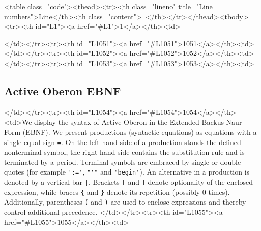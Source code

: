 <table class="code"><thead><tr><th class="lineno" title="Line numbers">Line</th><th class="content"> </th></tr></thead><tbody><tr><th id="L1"><a href="#L1">1</a></th><td>\documentclass[a4paper,11pt]{article}
\begin{document}
</td></tr><tr><th id="L1051"><a href="#L1051">1051</a></th><td>
</td></tr><tr><th id="L1052"><a href="#L1052">1052</a></th><td>
</td></tr><tr><th id="L1053"><a href="#L1053">1053</a></th><td>\subsection{Active Oberon EBNF}
</td></tr><tr><th id="L1054"><a href="#L1054">1054</a></th><td>We display the syntax of Active Oberon in the Extended Backus-Naur-Form (EBNF). We present productions (syntactic equations) as equations with a single equal sign \verb~=~. On the left hand side of a production stands the defined nonterminal symbol, the right hand side contains the substitution rule and is terminated by a period. Terminal symbols are embraced by single or double quotes (for example \verb~':='~, \verb~"'"~ and \verb~'begin'~). An alternative in a production is denoted by a vertical bar \verb~|~. Brackets \verb~[~ and \verb~]~ denote optionality of the enclosed expression, while braces \verb~{~ and \verb~}~ denote its repetition (possibly 0 times). Additionally, parentheses \verb~(~ and \verb~)~ are used to enclose expressions and thereby control additional precedence.
</td></tr><tr><th id="L1055"><a href="#L1055">1055</a></th><td>
\end{document}
